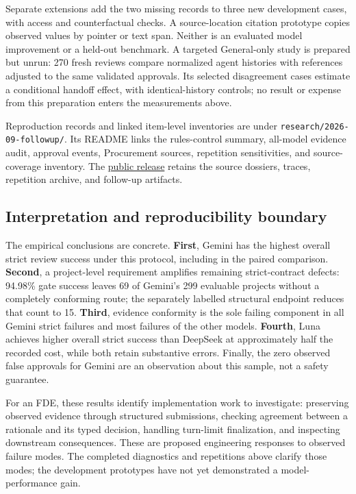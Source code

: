 Separate extensions add the two missing records to three new development cases, with access
and counterfactual checks. A source-location citation prototype copies observed values by
pointer or text span. Neither is an evaluated model improvement or a held-out benchmark.
A targeted General-only study is prepared but unrun: 270 fresh reviews compare normalized
agent histories with references adjusted to the same validated approvals. Its selected
disagreement cases estimate a conditional handoff effect, with identical-history controls;
no result or expense from this preparation enters the measurements above.

Reproduction records and linked item-level inventories are under
\nolinkurl{research/2026-09-followup/}. Its README links the rules-control summary,
all-model evidence audit, approval events, Procurement sources, repetition sensitivities,
and source-coverage inventory.
The \href{https://github.com/jeremy1392/dgf-agentic-bench/releases/tag/dgf-bench-300-20260923}{public release}
retains the source dossiers, traces, repetition archive, and follow-up artifacts.

\subsection{Interpretation and reproducibility boundary}

The empirical conclusions are concrete. \textbf{First}, Gemini has the highest overall strict
review success under this protocol, including in the paired comparison. \textbf{Second}, a
project-level requirement amplifies remaining strict-contract defects: 94.98\% gate success leaves
69 of Gemini's 299 evaluable projects without a completely conforming route; the separately
labelled structural endpoint reduces that count to 15. \textbf{Third}, evidence
conformity is the sole failing component in all Gemini strict failures and most failures of the
other models. \textbf{Fourth}, Luna achieves higher overall strict success than DeepSeek at
approximately half the recorded cost, while both retain substantive errors. Finally, the zero
observed false approvals for Gemini are an observation about this sample, not a safety guarantee.

For an FDE, these results identify implementation work to investigate: preserving observed evidence
through structured submissions, checking agreement between a rationale and its typed decision,
handling turn-limit finalization, and inspecting downstream consequences. These are proposed
engineering responses to observed failure modes. The completed diagnostics and repetitions above
clarify those modes; the development prototypes have not yet demonstrated a model-performance gain.

